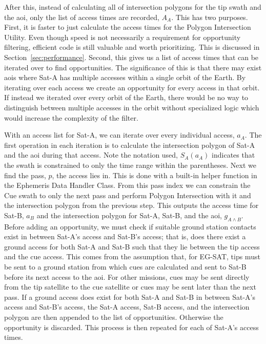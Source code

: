 After this, instead of calculating all of intersection polygons for the tip
swath and the \gls{aoi}, only the list of access times are recorded, $A_A$.
This has two purposes.  First, it is faster to just calculate the access times
for the Polygon Intersection Utility. Even though speed is not necessarily a
requirement for opportunity filtering, efficient code is still valuable and
worth prioritizing. This is discussed in Section~\ref{sec:performance}\@.
Second, this gives us a list of access times that can be iterated over to find
opportunities. The significance of this is that there may exist \glspl{aoi}
where Sat-A has multiple accesses within a single orbit of the Earth. By
iterating over each access we create an opportunity for every access in that
orbit. If instead we iterated over every orbit of the Earth, there would be no
way to distinguish between multiple accesses in the orbit without specialized
logic which would increase the complexity of the filter.

With an access list for Sat-A, we can iterate over every individual access,
$a_A$. The first operation in each iteration is to calculate the intersection
polygon of Sat-A and the \gls{aoi} during that access. Note the notation used,
$S_A(a_A)$ indicates that the swath is constrained to only the time range
within the parentheses. Next we find the pass, $p$, the access lies in.  This
is done with a built-in helper function in the Ephemeris Data Handler Class.
From this pass index we can constrain the Cue swath to only the next pass and perform
Polygon Intersection with it and the intersection polygon from the previous
step. This outputs the access time for Sat-B, $a_B$ and the intersection
polygon for Sat-A, Sat-B, and the \gls{aoi}, $g_{A \wedge B}$. Before adding an
opportunity, we must check if suitable ground station contacts exist in between
Sat-A's access and Sat-B's access; that is, does there exist a ground access
for both Sat-A and Sat-B such that they lie between the tip access and the cue
access. This comes from the assumption that, for EG-SAT, tips must be sent to a
ground station from which cues are calculated and sent to Sat-B before its next
access to the \gls{aoi}. For other missions, cues may be sent directly from the
tip satellite to the cue satellite or cues may be sent later than the next
pass.  If a ground access does exist for both Sat-A and Sat-B in between
Sat-A's access and Sat-B's access, the Sat-A access, Sat-B access, and the
intersection polygon are then appended to the list of opportunities.  Otherwise
the opportunity is discarded.  This process is then repeated for each of
Sat-A's access times.

